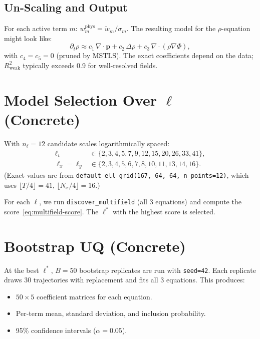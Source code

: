 \documentclass[11pt, letterpaper]{article}
\theoremstyle{definition}
\newcommand{\vp}{\mathbf{p}}
\newcommand{\lap}{\Delta}
\newcommand{\divop}{\nabla\!\cdot}
\newcommand{\grad}{\nabla}
\begin{document}
\subsection{Un-Scaling and Output}
For each active term $m$:
$w_m^{\mathrm{phys}} = \tilde{w}_m / \sigma_m$.
The resulting model for the $\rho$-equation might look like:
\begin{equation}
  \partial_t\rho \approx
  c_1\,\divop\vp + c_2\,\lap\rho + c_3\,\divop(\rho\grad\Phi),
\end{equation}
with $c_4 = c_5 = 0$ (pruned by MSTLS).  The exact coefficients
depend on the data; $R^{2}_{\mathrm{weak}}$ typically exceeds 0.9 for
well-resolved fields.

\section{Model Selection Over $\ell$ (Concrete)}
\label{sec:concrete-selection}

With $n_\ell = 12$ candidate scales logarithmically spaced:
\begin{align}
  \ell_t &\in \{2, 3, 4, 5, 7, 9, 12, 15, 20, 26, 33, 41\}, \\
  \ell_x = \ell_y &\in \{2, 3, 4, 5, 6, 7, 8, 10, 11, 13, 14, 16\}.
\end{align}
(Exact values are from \texttt{default\_ell\_grid(167, 64, 64, n\_points=12)},
which uses $\lfloor T/4 \rfloor = 41$, $\lfloor N_x/4 \rfloor = 16$.)

For each $\bm\ell$, we run \texttt{discover\_multifield} (all 3
equations) and compute the score~\eqref{eq:multifield-score}.
The $\bm\ell^{*}$ with the highest score is selected.

\section{Bootstrap UQ (Concrete)}
\label{sec:concrete-bootstrap}

At the best $\bm\ell^{*}$, $B = 50$ bootstrap replicates are run with
\texttt{seed=42}.  Each replicate draws 30 trajectories with
replacement and fits all 3 equations.  This produces:
\begin{itemize}[nosep]
  \item $50 \times 5$ coefficient matrices for each equation.
  \item Per-term mean, standard deviation, and inclusion probability.
  \item 95\% confidence intervals ($\alpha = 0.05$).
\end{itemize}
\end{document}
